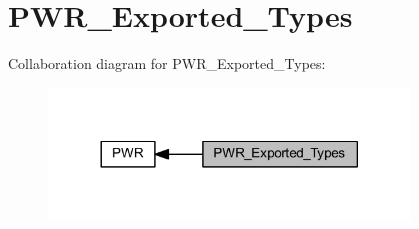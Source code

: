 \hypertarget{group___p_w_r___exported___types}{}\section{P\+W\+R\+\_\+\+Exported\+\_\+\+Types}
\label{group___p_w_r___exported___types}
Collaboration diagram for P\+W\+R\+\_\+\+Exported\+\_\+\+Types\+:
\nopagebreak
\begin{figure}[H]
\begin{center}
\leavevmode
\includegraphics[width=272pt]{group___p_w_r___exported___types}
\end{center}
\end{figure}
